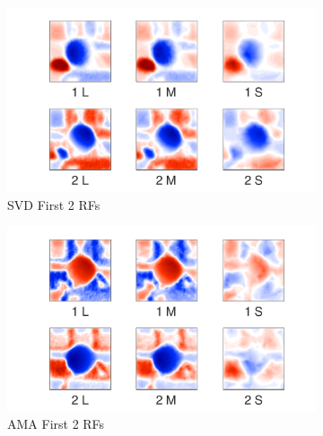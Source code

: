 \documentclass{jov}
\begin{document}
\begin{figure}
\centering
\begin{subfigure}[b]{0.27 \textwidth}
		\centering
        \includegraphics[width=\textwidth]{../Figures/Figure7/Figure7_a.pdf}
        \caption{SVD First 2 RFs}
        \label{fig:case12SVD}
    \end{subfigure}
    \begin{subfigure}[b]{0.27 \textwidth}   
        \includegraphics[width=\textwidth]{../Figures/Figure7/Figure7_b.pdf}
        \caption{AMA First 2 RFs}
        \label{fig:case12AMA}
    \end{subfigure}
        \begin{subfigure}[b]{0.20 \textwidth}

\end{subfigure}
\end{figure}
\end{document}
